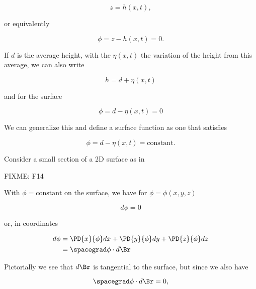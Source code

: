 \begin{equation}\label{eqn:continuumL13:160}
z = h(x, t),
\end{equation}

or equivalently

\begin{equation}\label{eqn:continuumL13:180}
\phi = z - h(x, t) = 0.
\end{equation}

If $d$ is the average height, with the $\eta(x,t)$ the variation of the height from this average, we can also write

\begin{equation}\label{eqn:continuumL13:200}
h = d + \eta(x, t)
\end{equation}

and for the surface

\begin{equation}\label{eqn:continuumL13:220}
\phi = d - \eta(x, t) = 0
\end{equation}

We can generalize this and define a surface function as one that satisfies

\begin{equation}\label{eqn:continuumL13:220b}
\phi = d - \eta(x, t) = \text{constant}.
\end{equation}

Consider a small section of a 2D surface as in

FIXME: F14

With $\phi = \text{constant}$ on the surface, we have for $\phi = \phi(x, y, z)$

\begin{equation}\label{eqn:continuumL13:240}
d\phi = 0 
\end{equation}

or, in coordinates

\begin{align*}
d\phi &= 
\PD{x}{\phi} dx
+\PD{y}{\phi} dy
+\PD{z}{\phi} dz \\
&= \spacegrad \phi \cdot d\Br
\end{align*}

Pictorially we see that $d\Br$ is tangential to the surface, but since we also have

\begin{equation}\label{eqn:continuumL13:360}
\spacegrad \phi \cdot d\Br = 0,
\end{equation}

